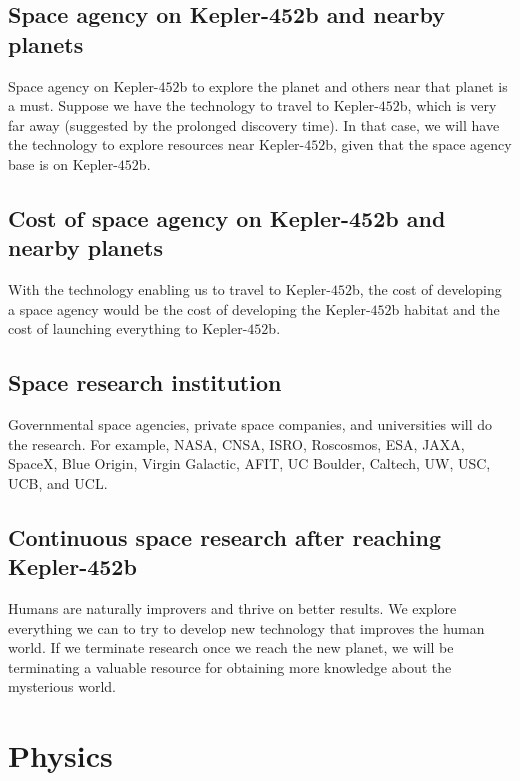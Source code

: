 \documentclass{article}
\begin{document}
\subsection{Space agency on Kepler-452b and nearby planets}
Space agency on Kepler-$452$b to explore the planet and others near that planet is a must. Suppose we have the technology to travel to Kepler-$452$b, which is very far away (suggested by the prolonged discovery time). In that case, we will have the technology to explore resources near Kepler-$452$b, given that the space agency base is on Kepler-$452$b. 
\subsection{Cost of space agency on Kepler-452b and nearby planets}
With the technology enabling us to travel to Kepler-$452$b, the cost of developing a space agency would be the cost of developing the Kepler-$452$b habitat and the cost of launching everything to Kepler-$452$b. 
\subsection{Space research institution}
Governmental space agencies, private space companies, and universities will do the research. For example, NASA, CNSA, ISRO, Roscosmos, ESA, JAXA, SpaceX, Blue Origin, Virgin Galactic, AFIT, UC Boulder, Caltech, UW, USC, UCB, and UCL. 
\subsection{Continuous space research after reaching Kepler-452b}
Humans are naturally improvers and thrive on better results. We explore everything we can to try to develop new technology that improves the human world. If we terminate research once we reach the new planet, we will be terminating a valuable resource for obtaining more knowledge about the mysterious world. 
\newpage
\section{Physics}
\end{document}
